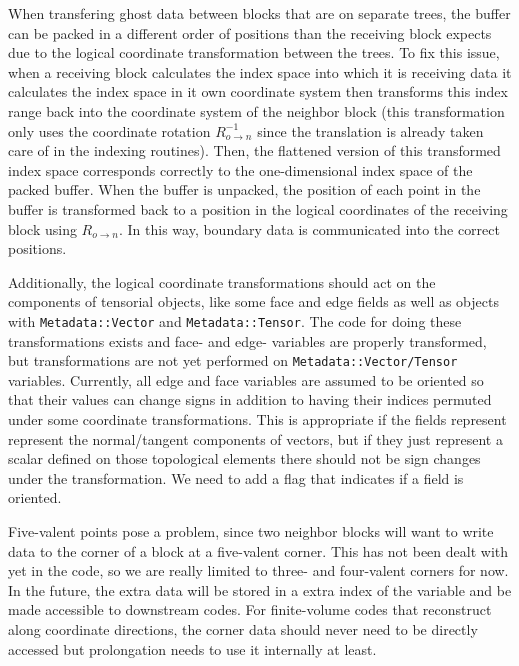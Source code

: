 \documentclass{article}
\begin{document}
When transfering ghost data between blocks that are on separate trees, the buffer can be packed in a different order of positions than the receiving block expects due to the logical coordinate transformation between the trees. To fix this issue, when a receiving block calculates the index space into which it is receiving data it calculates the index space in it own coordinate system then transforms this index range back into the coordinate system of the neighbor block (this transformation only uses the coordinate rotation $R_{o \rightarrow n}^{-1}$ since the translation is already taken care of in the indexing routines). Then, the flattened version of this transformed index space corresponds correctly to the one-dimensional index space of the packed buffer. When the buffer is unpacked, the position of each point in the buffer is transformed back to a position in the logical coordinates of the receiving block using $R_{o \rightarrow n}$. In this way, boundary data is communicated into the correct positions. 

Additionally, the logical coordinate transformations should act on the components of tensorial objects, like some face and edge fields as well as objects with \texttt{Metadata::Vector} and \texttt{Metadata::Tensor}. The code for doing these transformations exists and face- and edge- variables are properly transformed, but transformations are not yet performed on \texttt{Metadata::Vector/Tensor} variables. Currently, all edge and face variables are assumed to be oriented so that their values can change signs in addition to having their indices permuted under some coordinate transformations. This is appropriate if the fields represent represent the normal/tangent components of vectors, but if they just represent a scalar defined on those topological elements there should not be sign changes under the transformation. We need to add a flag that indicates if a field is oriented. 

Five-valent points pose a problem, since two neighbor blocks will want to write data to the corner of a block at a five-valent corner. This has not been dealt with yet in the code, so we are really limited to three- and four-valent corners for now. In the future, the extra data will be stored in a extra index of the variable and be made accessible to downstream codes. For finite-volume codes that reconstruct along coordinate directions, the corner data should never need to be directly accessed but prolongation needs to use it internally at least.
\end{document}
